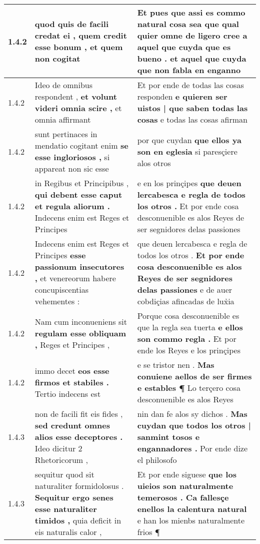 \begin{tabular}{|p{1cm}|p{6.5cm}|p{6.5cm}|}
1.4.2 & quod quis de facili credat ei , \textbf{ quem credit esse bonum , } et quem non cogitat & Et pues que assi es commo natural cosa sea \textbf{ que qual quier omne de ligero cree a aquel que cuyda que es bueno . } et aquel que cuyda que non fabla en enganno \\\hline
1.4.2 & Ideo de omnibus respondent , \textbf{ et volunt videri omnia scire , } et omnia affirmant & Et por ende de todas las cosas responden \textbf{ e quieren ser uistos | que saben todas las cosas } e todas las cosas afirman \\\hline
1.4.2 & sunt pertinaces in mendatio cogitant enim \textbf{ se esse ingloriosos , } si appareat non sic esse & por que cuydan \textbf{ que ellos ya son en eglesia } si paresçiere alos otros \\\hline
1.4.2 & in Regibus et Principibus , \textbf{ qui debent esse caput et regula aliorum . } Indecens enim est Reges et Principes & e en los prinçipes \textbf{ que deuen lercabesca e regla de todos los otros . } Et por ende cosa desconuenible es alos Reyes de ser segnidores delas passiones \\\hline
1.4.2 & Indecens enim est Reges et Principes \textbf{ esse passionum insecutores , } et venereorum habere concupiscentias vehementes : & que deuen lercabesca e regla de todos los otros . \textbf{ Et por ende cosa desconuenible es alos Reyes de ser segnidores delas passiones } e de auer cobdiçias afincadas de lux̉ia \\\hline
1.4.2 & Nam cum inconueniens sit \textbf{ regulam esse obliquam , } Reges et Principes , & Porque cosa desconuenible es que la regla sea tuerta \textbf{ e ellos son commo regla . } Et por ende los Reyes e los prinçipes \\\hline
1.4.2 & immo decet \textbf{ eos esse firmos et stabiles . } Tertio indecens est & e se tristor nen . \textbf{ Mas conuiene aellos de ser firmes e estables ¶ } Lo terçero cosa desconuenible es alos Reyes \\\hline
1.4.3 & non de facili fit eis fides , \textbf{ sed credunt omnes alios esse deceptores . } Ideo dicitur 2 Rhetoricorum , & nin dan fe alos sy dichos . \textbf{ Mas cuydan que todos los otros | sanmint tosos e engannadores . } Por ende dize el philosofo \\\hline
1.4.3 & sequitur quod sit naturaliter formidolosus . \textbf{ Sequitur ergo senes esse naturaliter timidos , } quia deficit in eis naturalis calor , & Et por ende siguese \textbf{ que los uieios son naturalmente temerosos . Ca fallesçe enellos la calentura natural } e han los mienbs naturalmente frios ¶ \\\hline

\end{tabular}
